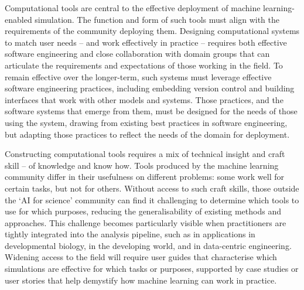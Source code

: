 Computational tools are central to the effective deployment of machine
learning-enabled simulation. The function and form of such tools must
align with the requirements of the community deploying them. Designing
computational systems to match user needs -- and work effectively in
practice -- requires both effective software engineering and close
collaboration with domain groups that can articulate the requirements
and expectations of those working in the field. To remain effective over
the longer-term, such systems must leverage effective software
engineering practices, including embedding version control and building
interfaces that work with other models and systems. Those practices, and
the software systems that emerge from them, must be designed for the
needs of those using the system, drawing from existing best practices in
software engineering, but adapting those practices to reflect the needs
of the domain for deployment.

Constructing computational tools requires a mix of technical insight and
craft skill -- of knowledge and know how. Tools produced by the machine
learning community differ in their usefulness on different problems:
some work well for certain tasks, but not for others. Without access to
such craft skills, those outside the `AI for science' community can find
it challenging to determine which tools to use for which purposes,
reducing the generalisability of existing methods and approaches. This
challenge becomes particularly visible when practitioners are tightly
integrated into the analysis pipeline, such as in applications in
developmental biology, in the developing world, and in data-centric
engineering. Widening access to the field will require user guides that
characterise which simulations are effective for which tasks or
purposes, supported by case studies or user stories that help demystify
how machine learning can work in practice.
